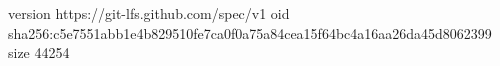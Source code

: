 version https://git-lfs.github.com/spec/v1
oid sha256:c5e7551abb1e4b829510fe7ca0f0a75a84cea15f64bc4a16aa26da45d8062399
size 44254
